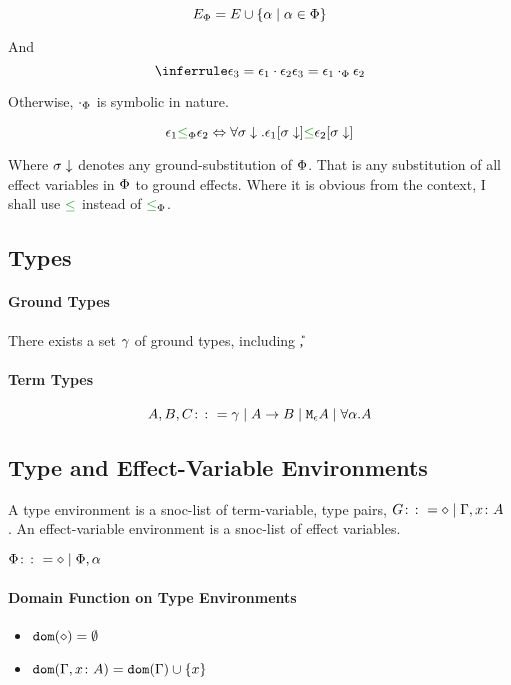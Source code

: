\documentclass{report}
\begin{document}
\begin{equation}
    E_\P = E \cup \{\a \mid \a \in \P \}
\end{equation}

And 
\begin{equation}
    \treeruleI{\e_3 = \e_1\dot\e_2}{\e_3 = \e_1\dotp\e_2}
\end{equation}

Otherwise, $\dotp$ is symbolic in nature.

\begin{equation}
    \e_1 \subeffectp \e_2 \Leftrightarrow \forall \si\downarrow. \e_1\sub{\si\downarrow} \subeffect \e_2\sub{\si\downarrow}
\end{equation}

Where $\si\downarrow$ denotes any ground-substitution of $\P$. That is any substitution of all effect variables in $\P$ to ground effects. Where it is obvious from the context, I shall use $\subeffect$ instead of $\subeffectp$.


\subsection{Types}
    \paragraph{Ground Types}
        There exists a set $\ground$ of ground types, including \U, \B
    \paragraph{Term Types}
    $$ A, B, C \gens \ground \mid \ab \mid \mea \mid \all{\a}{A}$$
  
\subsection{Type and Effect-Variable Environments}
A type environment is a snoc-list of term-variable, type pairs, $G \gens \nil \mid \gax$ .
An effect-variable environment is a snoc-list of effect variables.

$\P\gens\nil\mid\P, \a$
\paragraph{Domain Function on Type Environments}
\begin{itemize}
    \item $\dom{\nil} = \emptyset$
    \item $\dom{\gax} =  \dom{\G}  \cup \left\{x \right\}$
\end{itemize}
\end{document}

